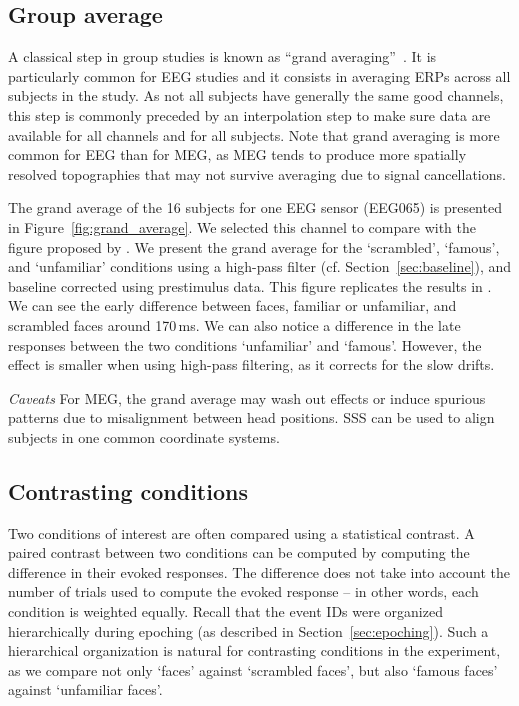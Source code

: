 \subsection{Group average}

A classical step in group studies is known as ``grand averaging''~\citep{delorme-etal:15}. It is particularly common for EEG studies and it consists in averaging ERPs across all subjects in the study. As not all subjects have generally the same good channels, this step is commonly preceded by an interpolation step to make sure data are available for all channels and for all subjects. Note that grand averaging is more common for EEG than for MEG, as MEG tends to produce more spatially resolved topographies that may not survive averaging due to signal cancellations.

The grand average of the 16 subjects for one EEG sensor (EEG065) is presented in Figure~\ref{fig:grand_average}. We selected this channel to compare with the figure proposed by \cite{wakeman2015multi}. We present the grand average for the `scrambled', `famous', and `unfamiliar' conditions using a high-pass filter (cf. Section~\ref{sec:baseline}), and baseline corrected using prestimulus data. This figure replicates the results in \citep{wakeman2015multi}. We can see the early difference between faces, familiar or unfamiliar, and scrambled faces around 170\,ms. We can also notice a difference in the late responses between the two conditions `unfamiliar' and `famous'. However, the effect is smaller when using high-pass filtering, as it corrects for the slow drifts.

\emph{Caveats} For MEG, the grand average may wash out effects or induce spurious patterns due to misalignment between head positions. SSS can be used to align subjects in one common coordinate systems.
    
\subsection{Contrasting conditions}

Two conditions of interest are often compared using a statistical contrast. A paired contrast between two conditions can be computed by computing the difference in their evoked responses. The difference does not take into account the number of trials used to compute the evoked response -- in other words, each condition is weighted equally. Recall that the event IDs were organized hierarchically during epoching (as described in Section~\ref{sec:epoching}). Such a hierarchical organization is natural for contrasting conditions in the experiment, as we compare not only `faces' against `scrambled faces', but also `famous faces' against `unfamiliar faces'.
    
